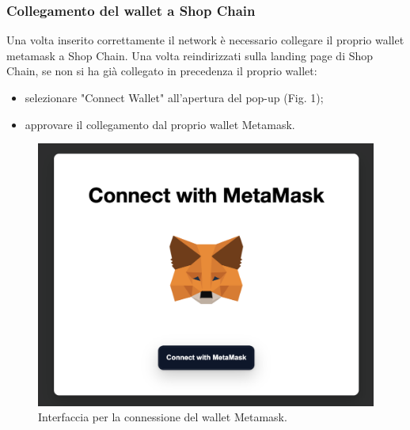 \documentclass[a4paper, 12pt]{article}
\begin{document}
\subsubsection{Collegamento del wallet a Shop Chain}
Una volta inserito correttamente il network è necessario collegare il proprio wallet metamask a Shop Chain. Una volta reindirizzati sulla landing page di Shop Chain, se non si ha già collegato in precedenza il proprio wallet:
\begin {itemize}
\item selezionare "Connect Wallet" all'apertura del pop-up (Fig. 1);
\item approvare il collegamento dal proprio wallet Metamask.
\end{itemize}

\FloatBarrier
\begin{figure}
\centering
\includegraphics[width=0.5\linewidth]{img/connessione_wallet.png}
\caption{Interfaccia per la connessione del wallet Metamask.}
\end{figure}
\FloatBarrier
\end{document}
